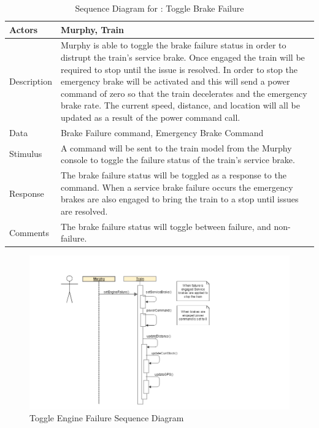 \documentclass[]{article}
\begin{document}
	\begin{table}[H]
	\centering
	\caption{Sequence Diagram for : Toggle Brake Failure}
	\begin{tabular}{|l|l|}
		\hline
		Actors & \parbox[t]{10cm}{Murphy, Train} \\ \hline
		Description & \parbox[t]{10cm}{Murphy is able to toggle the brake failure status in order to distrupt the train's service brake. Once engaged the train will be required to stop until the issue is resolved. In order to stop the emergency brake will be activated and this will send a power command of zero so that the train decelerates and the emergency brake rate. The current speed, distance, and location will all be updated as a result of the power command call. } \\ \hline
		Data &  \parbox[t]{10cm}{Brake Failure command, Emergency Brake Command} \\ \hline
		Stimulus &  \parbox[t]{10cm}{A command will be sent to the train model from the Murphy console to toggle the failure status of the train's service brake. } \\ \hline
		Response & \parbox[t]{10cm}{The brake failure status will be toggled as a response to the command. When a service brake failure occurs the emergency brakes are also engaged to bring the train to a stop until issues are resolved.}\\ \hline
		Comments & \parbox[t]{10cm}{The brake failure status will toggle between failure, and non-failure.}  \\ \hline
	\end{tabular}
\end{table}

\begin{figure}[H]
	\centering
	\includegraphics[scale=.5]{train_model_sqd_toggle_engine_failure.png}
	\caption{Toggle Engine Failure Sequence Diagram}
\end{figure}
\end{document}
